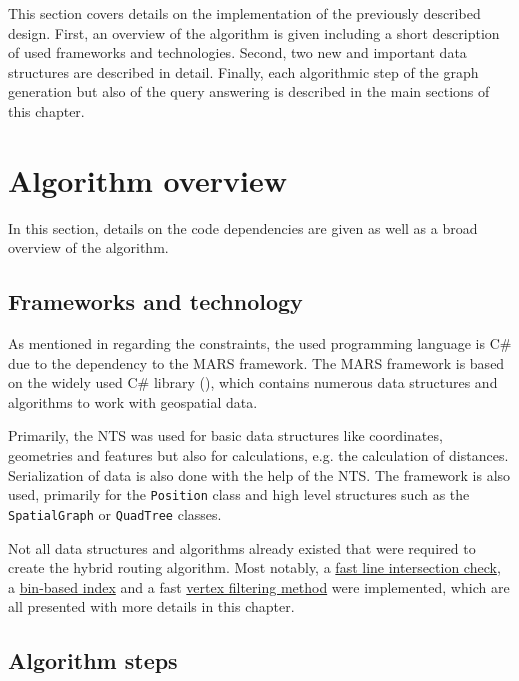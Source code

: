 
This section covers details on the implementation of the previously described design.
First, an overview of the algorithm is given including a short description of used frameworks and technologies.
Second, two new and important data structures are described in detail.
Finally, each algorithmic step of the graph generation but also of the query answering is described in the main sections of this chapter.

\section{Algorithm overview}

	In this section, details on the code dependencies are given as well as a broad overview of the algorithm.

	\subsection{Frameworks and technology}
	\label{subsec:frameworks-technology}
	
		As mentioned in  regarding the constraints, the used programming language is C\# due to the dependency to the MARS framework.
		The MARS framework is based on the widely used C\# library  (), which contains numerous data structures and algorithms to work with geospatial data.
		
		Primarily, the NTS was used for basic data structures like coordinates, geometries and features but also for calculations, e.g. the calculation of distances.
		Serialization of data is also done with the help of the NTS.
		The  framework is also used, primarily for the \texttt{Position} class and high level structures such as the \texttt{SpatialGraph} or \texttt{QuadTree} classes.
		
		Not all data structures and algorithms already existed that were required to create the hybrid routing algorithm.
		Most notably, a \hyperref[subsubsec:intersection-checks]{fast line intersection check}, a \hyperref[subsec:binindex]{bin-based index} and a fast \hyperref[subsec:shadow-areas]{vertex filtering method} were implemented, which are all presented with more details in this chapter.
			
	\subsection{Algorithm steps}
	\label{subsec:algorithm-steps}
	
